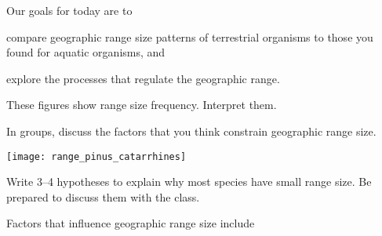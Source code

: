 \documentclass[t,handout]{beamer}  %
\begin{document}

\begin{frame}[t]{Our goals for today are to }

	
	\hangpara compare geographic range size patterns of terrestrial organisms to those you found for aquatic organisms, and
	
	\hangpara explore the processes that regulate the geographic range.

\end{frame}

{
\begin{frame}[t]{These figures show range size frequency. Interpret them.}

\end{frame}
}

%
%
%


\begin{frame}[t]{In groups, discuss the factors that you think constrain geographic range size.}

	\begin{center}
		\texttt{[image: range\_pinus\_catarrhines]}
	\end{center}
	
	\hangpara Write 3–4 hypotheses to explain why most species have small range size. Be prepared to discuss them with the class.
	
\end{frame}


\begin{frame}[t]{Factors that influence geographic range size include}

	\hangpara {} 
	
	\hangpara {}
	
	\hangpara {}

	\hangpara {}
	
		
\end{frame}
\end{document}
